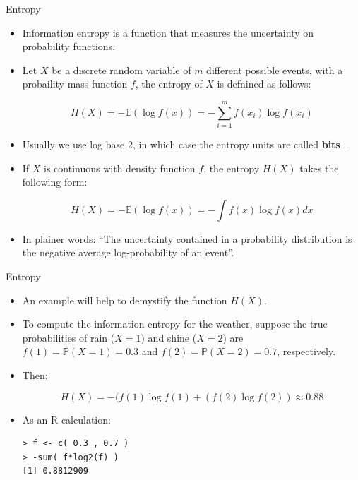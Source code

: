 \documentclass[handout]{beamer}
\begin{document}
\begin{frame}{Entropy}
\scriptsize{

\begin{itemize}

\item  Information entropy is a function that measures the uncertainty on probability functions.

\item Let $X$ be a discrete random variable of $m$ different possible events, with a probaility mass function $f$, the entropy of $X$ is defnined as follows:

\begin{equation}
 H(X) = - \mathbb{E}(\log f(x)) = -\sum_{i=1}^{m}f(x_i)\log f(x_i) 
\end{equation}

\item Usually we use log base 2, in which case the entropy units are called \textbf{bits} \cite{pml1Book}.

\item If $X$ is continuous with density function $f$, the entropy $H(X)$ takes the following form:

\begin{equation}
 H(X) = - \mathbb{E}(\log f(x)) = -\int f(x)\log f(x)dx
\end{equation}

\item In plainer words: ``The uncertainty contained in a probability distribution is the negative average log-probability of an event''.


\end{itemize}


} 
\end{frame}

\begin{frame}[fragile]{Entropy}
\scriptsize{

\begin{itemize}

\item  An example will help to demystify the function $H(X)$. 

\item To compute the information entropy for the weather, suppose the true probabilities of rain ($X=1$) and shine ($X=2$) are $f(1) = \mathbb{P}(X=1)= 0.3$ and $f(2) = \mathbb{P}(X=2) = 0.7$, respectively. 

\item Then:

\begin{displaymath}
 H(X) = - (f(1)\log f(1)+\left(f(2)\log f(2)\right) \approx 0.88
\end{displaymath}

\item As an R calculation:

\begin{verbatim}
> f <- c( 0.3 , 0.7 )
> -sum( f*log2(f) )
[1] 0.8812909
\end{verbatim}


\end{itemize}


} 
\end{frame}
\end{document}
